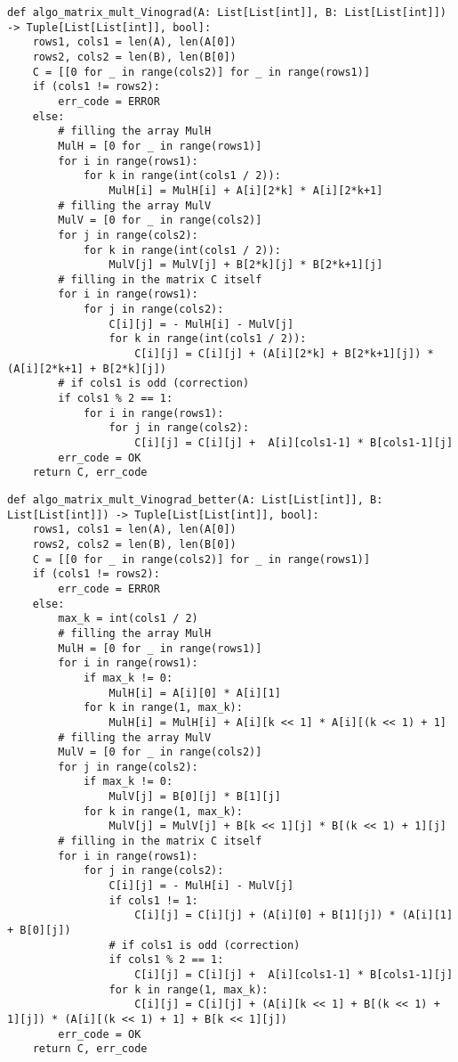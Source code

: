\vspace{0.25cm}
\begin{lstlisting}[caption=реализация алгоритма Винограда умножения матриц, label=lst:Vinograd]
def algo_matrix_mult_Vinograd(A: List[List[int]], B: List[List[int]]) -> Tuple[List[List[int]], bool]:
    rows1, cols1 = len(A), len(A[0])
    rows2, cols2 = len(B), len(B[0])
    C = [[0 for _ in range(cols2)] for _ in range(rows1)]
    if (cols1 != rows2):
        err_code = ERROR
    else:
        # filling the array MulH
        MulH = [0 for _ in range(rows1)]
        for i in range(rows1):
            for k in range(int(cols1 / 2)):
                MulH[i] = MulH[i] + A[i][2*k] * A[i][2*k+1]
        # filling the array MulV
        MulV = [0 for _ in range(cols2)]
        for j in range(cols2):
            for k in range(int(cols1 / 2)):
                MulV[j] = MulV[j] + B[2*k][j] * B[2*k+1][j]
        # filling in the matrix C itself
        for i in range(rows1):
            for j in range(cols2):
                C[i][j] = - MulH[i] - MulV[j]
                for k in range(int(cols1 / 2)):
                    C[i][j] = C[i][j] + (A[i][2*k] + B[2*k+1][j]) * (A[i][2*k+1] + B[2*k][j])
        # if cols1 is odd (correction)
        if cols1 % 2 == 1:
            for i in range(rows1):
                for j in range(cols2):
                    C[i][j] = C[i][j] +  A[i][cols1-1] * B[cols1-1][j]
        err_code = OK
    return C, err_code
\end{lstlisting}

\vspace{0.25cm}
\begin{lstlisting}[caption=реализация оптимизированного алгоритма Винограда умножения матриц, label=lst:Vinograd_better]
def algo_matrix_mult_Vinograd_better(A: List[List[int]], B: List[List[int]]) -> Tuple[List[List[int]], bool]:
    rows1, cols1 = len(A), len(A[0])
    rows2, cols2 = len(B), len(B[0])
    C = [[0 for _ in range(cols2)] for _ in range(rows1)]
    if (cols1 != rows2):
        err_code = ERROR
    else:
        max_k = int(cols1 / 2)
        # filling the array MulH
        MulH = [0 for _ in range(rows1)]
        for i in range(rows1):
            if max_k != 0:
                MulH[i] = A[i][0] * A[i][1]
            for k in range(1, max_k):
                MulH[i] = MulH[i] + A[i][k << 1] * A[i][(k << 1) + 1]
        # filling the array MulV
        MulV = [0 for _ in range(cols2)]
        for j in range(cols2):
            if max_k != 0:
                MulV[j] = B[0][j] * B[1][j]
            for k in range(1, max_k):
                MulV[j] = MulV[j] + B[k << 1][j] * B[(k << 1) + 1][j]
        # filling in the matrix C itself
        for i in range(rows1):
            for j in range(cols2):
                C[i][j] = - MulH[i] - MulV[j]
                if cols1 != 1:
                    C[i][j] = C[i][j] + (A[i][0] + B[1][j]) * (A[i][1] + B[0][j])
                # if cols1 is odd (correction)
                if cols1 % 2 == 1:
                    C[i][j] = C[i][j] +  A[i][cols1-1] * B[cols1-1][j]
                for k in range(1, max_k):
                    C[i][j] = C[i][j] + (A[i][k << 1] + B[(k << 1) + 1][j]) * (A[i][(k << 1) + 1] + B[k << 1][j])
        err_code = OK
    return C, err_code
\end{lstlisting}

